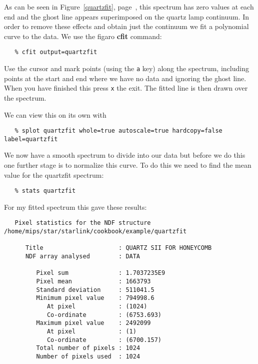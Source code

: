 \documentclass[twoside,11pt]{article}
\newcommand{\xref}[3]{#1}
\newcommand{\scspec}[2]{#1}
\newcommand{\scspec}[2]{#2}
\begin{document}
As can be seen in \scspec{Figure~\ref{quartzfit},
page~\pageref{quartzfit},}{the figure below,} this spectrum has zero
values at each end and the ghost line appears superimposed on the
quartz lamp continuum. In order to remove these effects and obtain
just the continuum we fit a polynomial curve to the data. We use the
\xref{{\sc figaro}}{sun86}{} \xref{{\bf cfit}}{sun86}{CFIT} command:

{\scspec{\small}{ }
\begin{verbatim}
   % cfit output=quartzfit
\end{verbatim}
}

Use the cursor and mark points (using the {\tt a} key) along the
spectrum, including points at the start and end where we have no data
and ignoring the ghost line. When you have finished this press {\tt x}
the exit. The fitted line is then drawn over the spectrum.



We can view this on its own with

{\scspec{\small}{ }
\begin{verbatim}
   % splot quartzfit whole=true autoscale=true hardcopy=false label=quartzfit
\end{verbatim}
}

We now have a smooth spectrum to divide into our data but before we do
this one further stage is to normalize this curve. To do this we need
to find the mean value for the quartzfit spectrum:

{\scspec{\small}{ }
\begin{verbatim}
   % stats quartzfit
\end{verbatim}
}

For my fitted spectrum this gave these results:

{\scspec{\small}{ }
\begin{verbatim}
   Pixel statistics for the NDF structure
/home/mips/star/starlink/cookbook/example/quartzfit

      Title                     : QUARTZ SII FOR HONEYCOMB
      NDF array analysed        : DATA

         Pixel sum              : 1.7037235E9
         Pixel mean             : 1663793
         Standard deviation     : 511041.5
         Minimum pixel value    : 794998.6
            At pixel            : (1024)
            Co-ordinate         : (6753.693)
         Maximum pixel value    : 2492099
            At pixel            : (1)
            Co-ordinate         : (6700.157)
         Total number of pixels : 1024
         Number of pixels used  : 1024
\end{verbatim}
}
\end{document}
